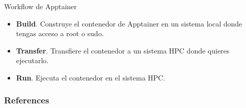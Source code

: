 \documentclass[11pt]{beamer}
\begin{document}
\begin{frame}{Workflow de Apptainer}
	\begin{itemize}
		\item \textbf{Build}. Construye el contenedor de Apptainer en un sistema local donde tengas acceso a root o sudo.
		\item \textbf{Transfer}. Transfiere el contenedor a un sistema HPC donde quieres ejecutarlo.
		\item \textbf{Run}. Ejecuta el contenedor en el sistema HPC.
	\end{itemize}
\end{frame}

\begin{frame}[allowframebreaks]
        \frametitle{References}
		

       
\end{frame}
\end{document}
